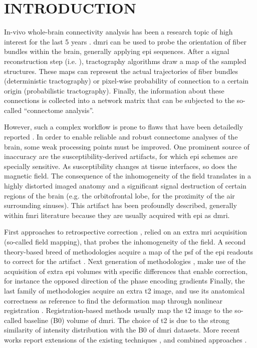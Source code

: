 \section{INTRODUCTION}

In-vivo whole-brain connectivity analysis has been a
research topic of high interest for the last
5 years \cite{jones_studying_2008}. 
\Gls*{dmri} can be used to probe the
orientation of fiber bundles within the brain,
generally applying \gls*{epi} sequences.
After a signal reconstruction step 
(i.e. \cite{basser_microstructural_2011}), 
tractography algorithms draw a map of the sampled 
structures.
These maps can represent the actual trajectories
of fiber bundles (deterministic tractography) or
pixel-wise probability of connection to a certain origin
(probabilistic tractography). Finally, the
information about these connections is collected
into a network matrix that can be subjected to
the so-called ``connectome analysis''.

However, such a complex workflow is prone to
flaws that have been detailedly reported 
\cite{jones_twenty-five_2010,jbabdi_tractography:_2011}.
In order to enable reliable and robust connectome
analyses of the brain, some weak processing points must
be improved. One prominent source
of inaccuracy are the susceptibility-derived artifacts,
for which \Gls*{epi} schemes are specially sensitive.
As susceptibility changes at tissue interfaces,
so does the magnetic field. The consequence of the 
inhomogeneity of the field translates in a highly 
distorted imaged anatomy and a significant signal 
destruction of certain regions of the brain 
(e.g. the orbitofrontal lobe, for the proximity of the
air surrounding sinuses). This artifact has been
profoundly described, generally within \gls*{fmri}
literature because they are usually acquired with 
\gls*{epi} as \gls*{dmri}. 

First approaches to
retrospective correction \cite{jezzard_correction_1995},
relied on an extra \gls*{mri} acquisition (so-called
field mapping), that probes the inhomogeneity of the field.
A second theory-based breed of methodologies acquire a 
map of the \gls*{psf} of the \gls*{epi} readouts to correct 
for the artifact \cite{robson_measurement_1997}. 
Next generation of methodologies \cite{cordes_geometric_2000,
chiou_simple_2000}, make use of the acquisition of 
extra \gls*{epi} volumes 
with specific differences that enable correction, for instance
the opposed direction of the phase encoding gradients 
Finally, the last family of methodologies acquire an 
extra \gls*{t2} image, and use its anatomical correctness 
as reference to find the deformation map through nonlinear 
registration \cite{kybic_unwarping_2000,studholme_accurate_2000}.
Registration-based methods usually map
the \gls*{t2} image to the so-called baseline (B0) volume 
of \gls*{dmri}. The choice of \gls*{t2} is due to the strong
similarity of intensity distribution with the B0 of \gls*{dmri}
datasets. More recent works report extensions of the existing
techniques \cite{andersson_how_2003,holland_efficient_2010,
andersson_comprehensive_2012}, and combined approaches
\cite{zaitsev_point_2004}.

